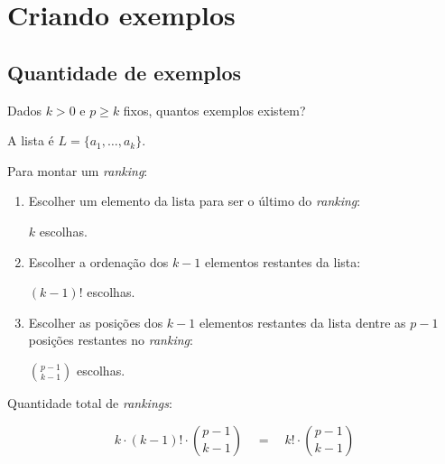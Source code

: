 \documentclass[
  letterpaper,
  DIV=11,
  numbers=noendperiod]{scrreprt}
\begin{document}
\section{Criando exemplos}\label{criando-exemplos}

\subsection{Quantidade de exemplos}\label{quantidade-de-exemplos}

Dados $k > 0$ e $p \geq k$ fixos, quantos exemplos existem?

A lista é $L = \{ a_1, \ldots, a_k \}$.

Para montar um \emph{ranking}:

\begin{enumerate}
\def\labelenumi{\arabic{enumi}.}
\item
  Escolher um elemento da lista para ser o último do \emph{ranking}:

  $k$ escolhas.
\item
  Escolher a ordenação dos $k - 1$ elementos restantes da lista:

  $(k - 1)!$ escolhas.
\item
  Escolher as posições dos $k - 1$ elementos restantes da lista dentre
  as $p - 1$ posições restantes no \emph{ranking}:

  $\binom{p - 1}{k - 1}$ escolhas.
\end{enumerate}

Quantidade total de \emph{rankings}:

\[
k \cdot (k - 1)! \cdot \binom{p - 1}{k - 1} 
\quad=\quad
k! \cdot \binom{p - 1}{k - 1}
\]
\end{document}
